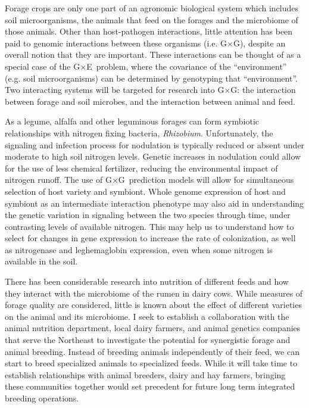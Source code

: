\documentclass[11pt]{article}
\newcommand{\gxe}{G$\times$E}
\newcommand{\gxg}{G$\times$G}
\begin{document}
Forage crops are only one part of an agronomic biological system which includes soil microorganisms, the animals that feed on the forages and the microbiome of those animals. Other than host-pathogen interactions, little attention has been paid to genomic interactions between these organisms (i.e. \gxg), despite an overall notion that they are important. These interactions can be thought of as a special case of the \gxe\ problem, where the covariance of the ``environment'' (e.g. soil microorganisms) can be determined by genotyping that ``environment''. Two interacting systems will be targeted for research into \gxg: the interaction between forage and soil microbes, and the interaction between animal and feed. 


As a legume, alfalfa and other leguminous forages can form symbiotic relationships with nitrogen fixing bacteria, \emph{Rhizobium}. Unfortunately, the signaling and infection process for nodulation is typically reduced or absent under moderate to high soil nitrogen levels. Genetic increases in nodulation could allow for the use of less chemical fertilizer, reducing the environmental impact of nitrogen runoff. The use of \gxg\ prediction models will allow for simultaneous selection of host variety and symbiont. Whole genome expression of host and symbiont as an intermediate interaction phenotype may also aid in understanding the genetic variation in signaling between the two species through time, under contrasting levels of available nitrogen. This may help us to understand how to select for changes in gene expression to increase the rate of colonization, as well as nitrogenase and leghemaglobin expression, even when some nitrogen is available in the soil. 



There has been considerable research into nutrition of different feeds and how they interact with the microbiome of the rumen in dairy cows. While measures of forage quality are considered, little is known about the effect of different varieties on the animal and its microbiome. I seek to establish a collaboration with the animal nutrition department, local dairy farmers, and animal genetics companies that serve the Northeast to investigate the potential for synergistic forage and animal breeding. Instead of breeding animals independently of their feed, we can start to breed specialized animals to specialized feeds. While it will take time to establish relationships with animal breeders, dairy and hay farmers, bringing these communities together would set precedent for future long term integrated breeding operations.
\end{document}
